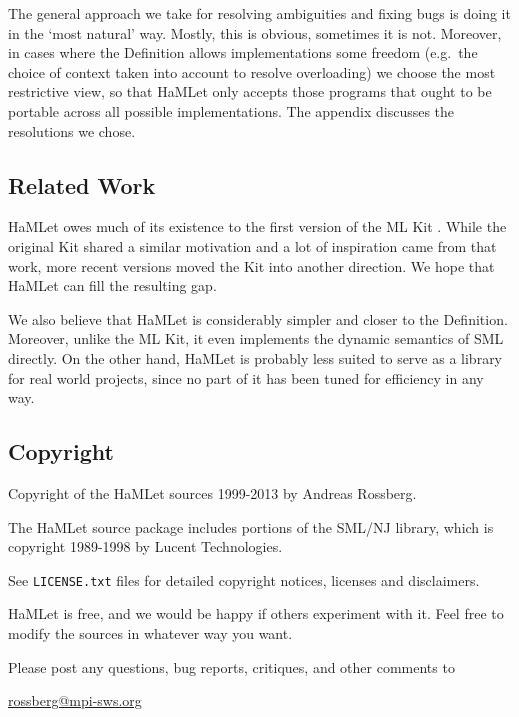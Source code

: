 \documentclass[twoside,titlepage]{article}
\begin{document}
The general approach we take for resolving ambiguities and fixing bugs is doing it in the `most natural' way. Mostly, this is obvious, sometimes it is not. Moreover, in cases where the Definition allows implementations some freedom (e.g.\ the choice of context taken into account to resolve overloading) we choose the most restrictive view, so that HaMLet only accepts those programs that ought to be portable across all possible implementations. The appendix discusses the resolutions we chose.


\subsection{Related Work}
\label{related}

HaMLet owes much of its existence to the first version of the ML Kit \cite{kit}. While the original Kit shared a similar motivation and a lot of inspiration came from that work, more recent versions moved the Kit into another direction. We hope that HaMLet can fill the resulting gap.

We also believe that HaMLet is considerably simpler and closer to the Definition. Moreover, unlike the ML Kit, it even implements the dynamic semantics of SML directly.
On the other hand, HaMLet is probably less suited to serve as a library for real world projects, since no part of it has been tuned for efficiency in any way.


\subsection{Copyright}
\label{copyright}

Copyright of the HaMLet sources 1999-2013 by Andreas Rossberg.

The HaMLet source package includes portions of the SML/NJ library, which is copyright 1989-1998 by Lucent Technologies.

See {\tt LICENSE.txt} files for detailed copyright notices, licenses and disclaimers.

HaMLet is free, and we would be happy if others experiment with it. Feel free to modify the sources in whatever way you want.

Please post any questions, bug reports, critiques, and other comments to

\begin{quoting}
\url{rossberg@mpi-sws.org}
\end{quoting}
\end{document}
